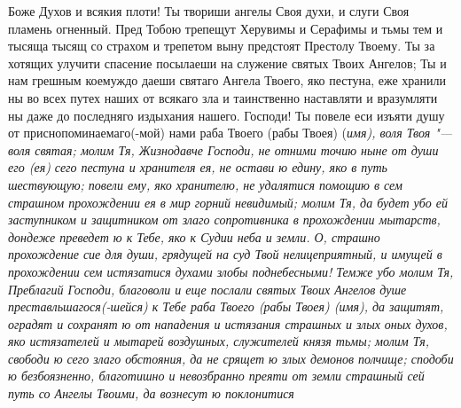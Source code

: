 Боже Духов и всякия плоти! Ты твориши ангелы Своя духи, и слуги Своя пламень огненный. Пред Тобою трепещут Херувимы и Серафимы и тьмы тем и тысяща тысящ со страхом и трепетом выну предстоят Престолу Твоему. Ты за хотящих улучити спасение посылаеши на служение святых Твоих Ангелов; Ты и нам грешным коемуждо даеши святаго Ангела Твоего, яко пестуна, еже хранили ны во всех путех наших от всякаго зла и таинственно наставляти и вразумляти ны даже до последняго издыхания нашего. Господи! Ты повеле еси изъяти душу от приснопоминаемаго(-мой) нами раба Твоего (рабы Твоея) (\itshape имя\normalfont{}), воля Твоя "--- воля святая; молим Тя, Жизнодавче Господи, не отними точию ныне от души его (ея) сего пестуна и хранителя ея, не остави ю едину, яко в путь шествующую; повели ему, яко хранителю, не удалятися помощию в сем страшном прохождении ея в мир горний невидимый; молим Тя, да будет убо ей заступником и защитником от злаго сопротивника в прохождении мытарств, дондеже преведет ю к Тебе, яко к Судии неба и земли. О, страшно прохождение сие для души, грядущей на суд Твой нелицеприятный, и имущей в прохождении сем истязатися духами злобы поднебесными! Темже убо молим Тя, Преблагий Господи, благоволи и еще послали святых Твоих Ангелов душе преставльшагося(-шейся) к Тебе раба Твоего (рабы Твоея) (\itshape имя\normalfont{}), да защитят, оградят и сохранят ю от нападения и истязания страшных и злых оных духов, яко истязателей и мытарей воздушных, служителей князя тьмы; молим Тя, свободи ю сего злаго обстояния, да не срящет ю злых демонов полчище; сподоби ю безбоязненно, благотишно и невозбранно преяти от земли страшный сей путь со Ангелы Твоими, да вознесут ю поклонитися 
\mychapterending

 

\vspace{-\baselineskip}

